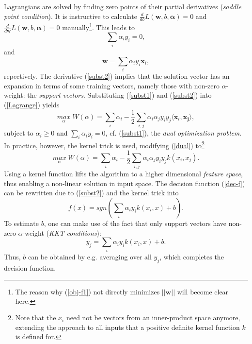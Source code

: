 \documentclass[a4paper,10pt]{article}
\begin{document}
Lagrangians are solved by finding zero points of their partial derivatives (\textit{saddle point condition}). It is instructive to calculate $\frac{d}{db}L(\mathbf{w},b,\bm{\alpha})=0$ and $\frac{d}{d\mathbf{w}}L(\mathbf{w},b,\bm{\alpha})=0$ manually\footnote{The reason why (\ref{obj-f1}) not directly minimizes $||\mathbf{w}||$ will become clear here.}. This leads to
\begin{equation}
\label{subst1}
 \sum_i \alpha_i y_i = 0,
\end{equation} 
and 
\begin{equation}
\label{subst2}
 \mathbf{w}=\sum_i \alpha_i y_i \mathbf{x}_i,
\end{equation} 
repectively. The derivative (\ref{subst2}) implies that the solution vector has an expansion in terms of some training vectors, namely those with non-zero $\alpha$-weight: the \textit{support vectors}. Substituting (\ref{subst1}) and (\ref{subst2}) into (\ref{Lagrange}) yields
\begin{equation}
\label{dual}
 \underset{\alpha}{max}\;W(\alpha) = \sum_i \alpha_i -\frac{1}{2}\sum_{i,j}\alpha_i \alpha_j y_i y_j \langle \mathbf{x}_i, \mathbf{x_j}\rangle,
\end{equation} 
subject to $\alpha_i\ge 0$ and $\sum_i \alpha_i y_i = 0$, cf. (\ref{subst1}), the \textit{dual optimization problem}. In practice, however, the kernel trick is used, modifying (\ref{dual}) to\footnote{Note that the $x_i$ need not be vectors from an inner-product space anymore, extending the approach to all inputs that a positive definite kernel function $k$ is defined for.}
\begin{equation}
\label{dual_k}
 \underset{\alpha}{max}\;W(\alpha) = \sum_i \alpha_i -\frac{1}{2}\sum_{i,j}\alpha_i \alpha_j y_i y_j k(x_i, x_j).
\end{equation} 
Using a kernel function lifts the algorithm to a higher dimensional \textit{feature space}, thus enabling a non-linear solution in input space.
The decision function (\ref{dec-f}) can be rewritten due to (\ref{subst2}) and the kernel trick into
\begin{equation}
 \label{dec-f2}
 f(x) = sgn(\sum_i \alpha_i y_i k(x_i,x) + b).
\end{equation} 
To estimate $b$, one can make use of the fact that only support vectors have non-zero $\alpha$-weight (\textit{KKT conditions}):
\begin{equation}
\label{thresh}
 y_j = \sum_i \alpha_i y_i k(x_i,x) + b.
\end{equation} 
Thus, $b$ can be obtained by e.g. averaging over all $y_j$, which completes the decision function.
\end{document}
